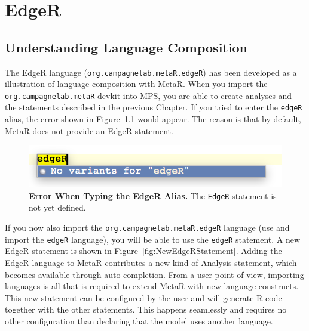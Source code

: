 

\chapter{EdgeR}\label{chap:EdgeR}
\section{Understanding Language Composition}

The EdgeR language (\texttt{org.campagnelab.metaR.edgeR}) has been developed as a illustration of language composition with MetaR. When you import the \texttt{org.campagnelab.metaR} devkit into MPS, you are able to create analyses and the statements described in the previous Chapter. If you tried to enter the \texttt{edgeR} alias, the error shown in Figure~\ref{fig:ErrorEdgeRNotDefined} would appear. The reason is that by default, MetaR does not provide an EdgeR statement. 
\begin{figure}
  \centering
  \includegraphics[width=\figWidthNarrow]{figures/edgeR_error-nosuchstatement.png}
\caption[Error When Typing the EdgeR Alias.]{\textbf{Error When Typing the EdgeR Alias.} The \texttt{EdgeR} statement is not yet defined.}
\label{fig:ErrorEdgeRNotDefined}
\end{figure}

If you now also import the \texttt{org.campagnelab.metaR.edgeR} language (use  and import the \texttt{edgeR} language), you will be able to use the \texttt{edgeR} statement. A new EdgeR statement is shown in Figure~\ref{fig:NewEdgeRStatement}. Adding the EdgeR language to MetaR contributes a new kind of Analysis statement, which becomes available through auto-completion. From a user point of view, importing languages is all that is required to extend MetaR with new language constructs. This new statement can be configured by the user and will generate R code together with the other statements. This happens seamlessly and requires no other configuration than declaring that the model uses another language.


